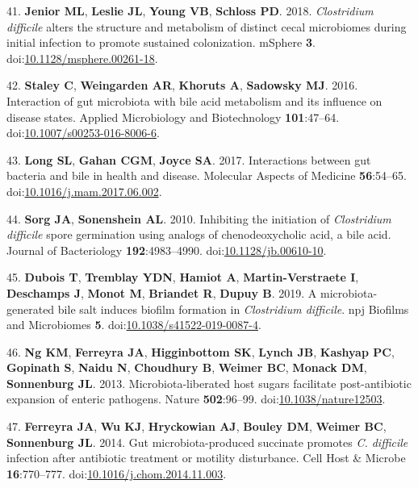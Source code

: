 \documentclass[
  12pt,
]{article}
\newenvironment{cslreferences}%
  {}%
  {\par}
\begin{document}
\begin{cslreferences}
\leavevmode\hypertarget{ref-Jenior2018}{}%
41. \textbf{Jenior ML}, \textbf{Leslie JL}, \textbf{Young VB},
\textbf{Schloss PD}. 2018. \emph{Clostridium difficile} alters the
structure and metabolism of distinct cecal microbiomes during initial
infection to promote sustained colonization. mSphere \textbf{3}.
doi:\href{https://doi.org/10.1128/msphere.00261-18}{10.1128/msphere.00261-18}.

\leavevmode\hypertarget{ref-Staley2016}{}%
42. \textbf{Staley C}, \textbf{Weingarden AR}, \textbf{Khoruts A},
\textbf{Sadowsky MJ}. 2016. Interaction of gut microbiota with bile acid
metabolism and its influence on disease states. Applied Microbiology and
Biotechnology \textbf{101}:47--64.
doi:\href{https://doi.org/10.1007/s00253-016-8006-6}{10.1007/s00253-016-8006-6}.

\leavevmode\hypertarget{ref-Long2017}{}%
43. \textbf{Long SL}, \textbf{Gahan CGM}, \textbf{Joyce SA}. 2017.
Interactions between gut bacteria and bile in health and disease.
Molecular Aspects of Medicine \textbf{56}:54--65.
doi:\href{https://doi.org/10.1016/j.mam.2017.06.002}{10.1016/j.mam.2017.06.002}.

\leavevmode\hypertarget{ref-Sorg2010}{}%
44. \textbf{Sorg JA}, \textbf{Sonenshein AL}. 2010. Inhibiting the
initiation of \emph{Clostridium difficile} spore germination using
analogs of chenodeoxycholic acid, a bile acid. Journal of Bacteriology
\textbf{192}:4983--4990.
doi:\href{https://doi.org/10.1128/jb.00610-10}{10.1128/jb.00610-10}.

\leavevmode\hypertarget{ref-Dubois2019}{}%
45. \textbf{Dubois T}, \textbf{Tremblay YDN}, \textbf{Hamiot A},
\textbf{Martin-Verstraete I}, \textbf{Deschamps J}, \textbf{Monot M},
\textbf{Briandet R}, \textbf{Dupuy B}. 2019. A microbiota-generated bile
salt induces biofilm formation in \emph{Clostridium difficile}. npj
Biofilms and Microbiomes \textbf{5}.
doi:\href{https://doi.org/10.1038/s41522-019-0087-4}{10.1038/s41522-019-0087-4}.

\leavevmode\hypertarget{ref-Ng2013}{}%
46. \textbf{Ng KM}, \textbf{Ferreyra JA}, \textbf{Higginbottom SK},
\textbf{Lynch JB}, \textbf{Kashyap PC}, \textbf{Gopinath S},
\textbf{Naidu N}, \textbf{Choudhury B}, \textbf{Weimer BC},
\textbf{Monack DM}, \textbf{Sonnenburg JL}. 2013. Microbiota-liberated
host sugars facilitate post-antibiotic expansion of enteric pathogens.
Nature \textbf{502}:96--99.
doi:\href{https://doi.org/10.1038/nature12503}{10.1038/nature12503}.

\leavevmode\hypertarget{ref-Ferreyra2014}{}%
47. \textbf{Ferreyra JA}, \textbf{Wu KJ}, \textbf{Hryckowian AJ},
\textbf{Bouley DM}, \textbf{Weimer BC}, \textbf{Sonnenburg JL}. 2014.
Gut microbiota-produced succinate promotes \emph{C. difficile} infection
after antibiotic treatment or motility disturbance. Cell Host \& Microbe
\textbf{16}:770--777.
doi:\href{https://doi.org/10.1016/j.chom.2014.11.003}{10.1016/j.chom.2014.11.003}.


\end{cslreferences}
\end{document}
